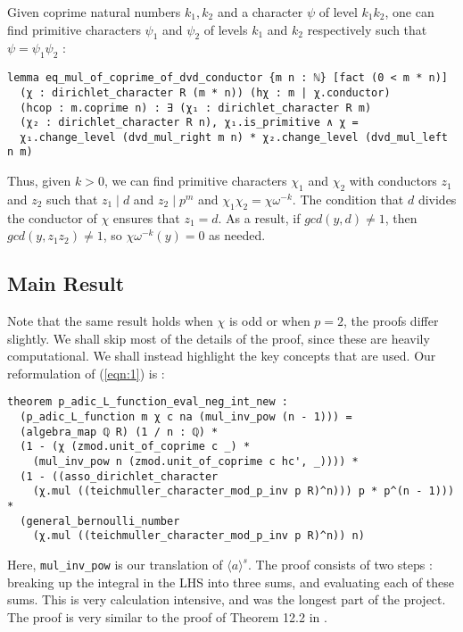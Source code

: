 \documentclass[a4paper,UKenglish,cleveref, autoref, thm-restate,pdfa]{lipics-v2021}
\newcommand{\lean}[1]{\texttt{#1}\xspace} %
\begin{document}
Given coprime natural numbers $k_1, k_2$ and a character $\psi$ of level $k_1 k_2$, one can find primitive characters 
$\psi_1$ and $\psi_2$ of levels $k_1$ and $k_2$ respectively such that $\psi = \psi_1 \psi_2$ : 
\begin{lstlisting}
lemma eq_mul_of_coprime_of_dvd_conductor {m n : ℕ} [fact (0 < m * n)] 
  (χ : dirichlet_character R (m * n)) (hχ : m | χ.conductor) 
  (hcop : m.coprime n) : ∃ (χ₁ : dirichlet_character R m) 
  (χ₂ : dirichlet_character R n), χ₁.is_primitive ∧ χ = 
  χ₁.change_level (dvd_mul_right m n) * χ₂.change_level (dvd_mul_left n m) 
\end{lstlisting}
Thus, given $k > 0$, we can find primitive characters $\chi_1$ and $\chi_2$ with conductors $z_1$ and $z_2$ such that 
$z_1 \mid d$ and $z_2 \mid p^m$ and $\chi_1 \chi_2 = \chi \omega^{-k}$. The condition that $d$ divides the conductor of $\chi$ ensures 
that $z_1 = d$. As a result, if $gcd (y, d) \ne 1$, then $gcd (y, z_1 z_2) \ne 1$, so $\chi \omega^{-k} (y) = 0$ as needed.

\subsection{Main Result}
Note that the same result holds when $\chi$ is odd or when $p = 2$, the proofs differ slightly. We shall 
skip most of the details of the proof, since these are heavily computational. We shall instead highlight the key concepts 
that are used. Our reformulation of (\ref{eqn:1}) is :
\begin{lstlisting}
theorem p_adic_L_function_eval_neg_int_new :
  (p_adic_L_function m χ c na (mul_inv_pow (n - 1))) = 
  (algebra_map ℚ R) (1 / n : ℚ) *
  (1 - (χ (zmod.unit_of_coprime c _) * 
    (mul_inv_pow n (zmod.unit_of_coprime c hc', _)))) * 
  (1 - ((asso_dirichlet_character 
    (χ.mul ((teichmuller_character_mod_p_inv p R)^n))) p * p^(n - 1))) * 
  (general_bernoulli_number 
    (χ.mul ((teichmuller_character_mod_p_inv p R)^n)) n) 
\end{lstlisting}
Here, \lean{mul\_inv\_pow} is our translation of $\langle a \rangle ^s$. \newline
The proof consists of two steps : breaking up the integral in the LHS into three sums, 
and evaluating each of these sums. This is very calculation intensive, and was the longest part of the project. 
The proof is very similar to the proof of Theorem 12.2 in \cite{cyc}. 
\end{document}
